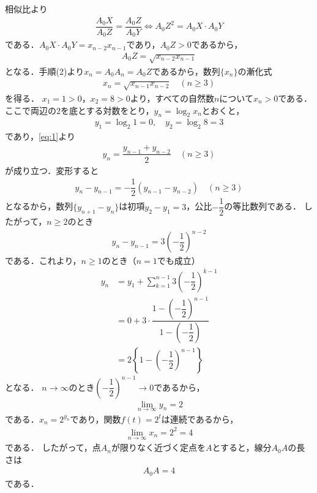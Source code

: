 \documentclass[../../main.tex]{subfiles}
\begin{document}
相似比より
\begin{align}
  \dfrac{A_0X}{A_0Z} = \dfrac{A_0Z}{A_0Y} \Longleftrightarrow A_0Z^2 = A_0X \cdot A_0Y
\end{align}
である．$A_0X \cdot A_0Y = x_{n-2}x_{n-1}$であり，$A_0Z > 0$であるから，
\begin{align}
  A_0Z = \sqrt{x_{n-2}x_{n-1}}
\end{align}
となる．手順(2)より$x_n = A_0A_n = A_0Z$であるから，数列$\{x_n\}$の漸化式
\begin{align}
  x_n = \sqrt{x_{n-1}x_{n-2}} \quad (n \ge 3) \label{eq:1}
\end{align}
を得る．
$x_1 = 1 > 0$，$x_2 = 8 > 0$より，すべての自然数$n$について$x_n > 0$である．
ここで両辺の$2$を底とする対数をとり，$y_n = \log_2 x_n$とおくと，
\begin{align}
  y_1 = \log_2 1 = 0, \quad y_2 = \log_2 8 = 3
\end{align}
であり，\cref{eq:1}より
\begin{align}
  y_n = \dfrac{y_{n-1} + y_{n-2}}{2} \quad (n \ge 3)
\end{align}
が成り立つ．変形すると
\begin{align}
  y_n - y_{n-1} = -\dfrac{1}{2}(y_{n-1} - y_{n-2}) \quad (n \ge 3)
\end{align}
となるから，数列$\{y_{n+1} - y_n\}$は初項$y_2 - y_1 = 3$，公比$-\dfrac{1}{2}$の等比数列である．
したがって，$n \ge 2$のとき
\begin{align}
  y_n - y_{n-1} = 3\left(-\dfrac{1}{2}\right)^{n-2}
\end{align}
である．これより，$n \ge 1$のとき（$n=1$でも成立）
\begin{align}
  y_n &= y_1 + \sum_{k=1}^{n-1} 3\left(-\dfrac{1}{2}\right)^{k-1} \nonumber\\
  &= 0 + 3 \cdot \dfrac{1 - \left(-\dfrac{1}{2}\right)^{n-1}}{1 - \left(-\dfrac{1}{2}\right)} \nonumber\\
  &= 2\left\{ 1 - \left(-\dfrac{1}{2}\right)^{n-1} \right\}
\end{align}
となる．
$n \to \infty$のとき$\left(-\dfrac{1}{2}\right)^{n-1} \to 0$であるから，
\begin{align}
  \lim_{n \to \infty} y_n = 2
\end{align}
である．$x_n = 2^{y_n}$であり，関数$f(t) = 2^t$は連続であるから，
\begin{align}
  \lim_{n \to \infty} x_n = 2^2 = 4
\end{align}
である．
したがって，点$A_n$が限りなく近づく定点を$A$とすると，線分$A_0A$の長さは
\begin{align}
  A_0A = 4 \tag{答}
\end{align}
である．
\end{document}
